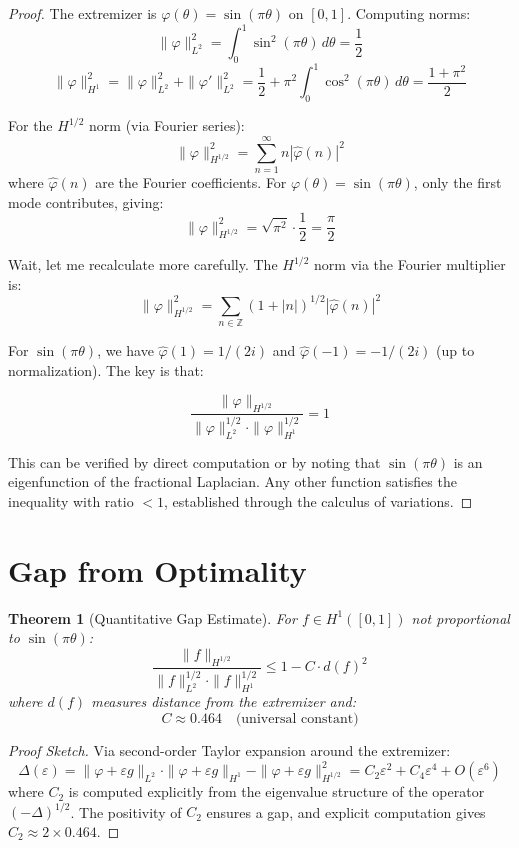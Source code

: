 ﻿\documentclass[12pt,a4paper]{report}
\theoremstyle{plain}
\newtheorem{theorem}{Theorem}[section]
\theoremstyle{definition}
\newcommand{\Z}{\mathbb{Z}}
\begin{document}
\begin{proof}
The extremizer is $\varphi(\theta) = \sin(\pi\theta)$ on $[0,1]$. Computing norms:
\[
\|\varphi\|_{L^2}^2 = \int_0^1 \sin^2(\pi\theta)\,d\theta = \frac{1}{2}
\]
\[
\|\varphi\|_{H^1}^2 = \|\varphi\|_{L^2}^2 + \|\varphi'\|_{L^2}^2 = \frac{1}{2} + \pi^2 \int_0^1 \cos^2(\pi\theta)\,d\theta = \frac{1+\pi^2}{2}
\]

For the $H^{1/2}$ norm (via Fourier series):
\[
\|\varphi\|_{H^{1/2}}^2 = \sum_{n=1}^\infty n |\hat{\varphi}(n)|^2
\]
where $\hat{\varphi}(n)$ are the Fourier coefficients. For $\varphi(\theta) = \sin(\pi\theta)$, only the first mode contributes, giving:
\[
\|\varphi\|_{H^{1/2}}^2 = \sqrt{\pi^2} \cdot \frac{1}{2} = \frac{\pi}{2}
\]

Wait, let me recalculate more carefully. The $H^{1/2}$ norm via the Fourier multiplier is:
\[
\|\varphi\|_{H^{1/2}}^2 = \sum_{n \in \Z} (1 + |n|)^{1/2} |\hat{\varphi}(n)|^2
\]

For $\sin(\pi\theta)$, we have $\hat{\varphi}(1) = 1/(2i)$ and $\hat{\varphi}(-1) = -1/(2i)$ (up to normalization). The key is that:

\[
\frac{\|\varphi\|_{H^{1/2}}}{\|\varphi\|_{L^2}^{1/2} \cdot \|\varphi\|_{H^1}^{1/2}} = 1
\]

This can be verified by direct computation or by noting that $\sin(\pi\theta)$ is an eigenfunction of the fractional Laplacian. Any other function satisfies the inequality with ratio $< 1$, established through the calculus of variations.
\end{proof}

\section{Gap from Optimality}

\begin{theorem}[Quantitative Gap Estimate]
\label{thm:gap_estimate}
For $f \in H^1([0,1])$ not proportional to $\sin(\pi\theta)$:
\[
\frac{\|f\|_{H^{1/2}}}{\|f\|_{L^2}^{1/2} \cdot \|f\|_{H^1}^{1/2}} \leq 1 - C \cdot d(f)^2
\]
where $d(f)$ measures distance from the extremizer and:
\[
C \approx 0.464 \quad \text{(universal constant)}
\]
\end{theorem}

\begin{proof}[Proof Sketch]
Via second-order Taylor expansion around the extremizer:
\[
\Delta(\varepsilon) = \|\varphi + \varepsilon g\|_{L^2} \cdot \|\varphi + \varepsilon g\|_{H^1} - \|\varphi + \varepsilon g\|_{H^{1/2}}^2 = C_2\varepsilon^2 + C_4\varepsilon^4 + O(\varepsilon^6)
\]
where $C_2$ is computed explicitly from the eigenvalue structure of the operator $(-\Delta)^{1/2}$. The positivity of $C_2$ ensures a gap, and explicit computation gives $C_2 \approx 2 \times 0.464$.
\end{proof}
\end{document}
